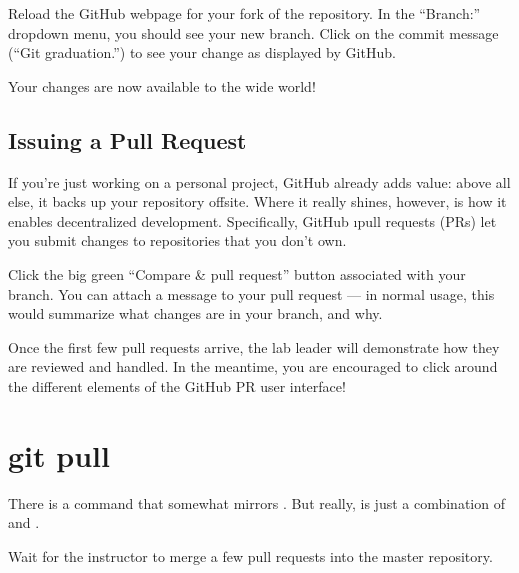 \documentclass[letterpaper, 12pt, titlepage, twoside]{article}
\begin{document}
\begin{noncli}
  Reload the GitHub webpage for your fork of the  repository. In
  the ``Branch:'' dropdown menu, you should see your new 
  branch. Click on the commit message (``Git graduation.'') to see your change
  as displayed by GitHub.
\end{noncli}

Your changes are now available to the wide world!

\subsection*{Issuing a Pull Request}


If you're just working on a personal project, GitHub already adds value: above
all else, it backs up your repository offsite. Where it really shines,
however, is how it enables decentralized development. Specifically, GitHub
\i{pull requests} (PRs) \x let you submit changes to repositories that you
don't own.

\begin{noncli}
  Click the big green ``Compare \& pull request'' button associated with your
   branch. You can attach a message to your pull request --- in
  normal usage, this would summarize what changes are in your branch, and why.

  Once the first few pull requests arrive, the lab leader will demonstrate how
  they are reviewed and handled. In the meantime, you are encouraged to click
  around the different elements of the GitHub PR user interface!
\end{noncli}


\section{git pull}

There is a  command that somewhat mirrors . But really,
 is just a combination of  and .

\begin{noncli}
  Wait for the instructor to merge a few pull requests into the master
  repository.
\end{noncli}

\end{document}
